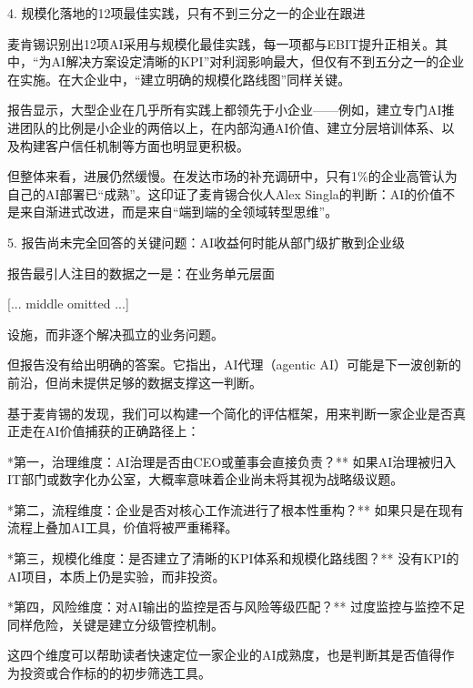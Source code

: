 \documentclass[11pt]{ctexart}
\begin{document}
4. 规模化落地的12项最佳实践，只有不到三分之一的企业在跟进

麦肯锡识别出12项AI采用与规模化最佳实践，每一项都与EBIT提升正相关。其中，“为AI解决方案设定清晰的KPI”对利润影响最大，但仅有不到五分之一的企业在实施。在大企业中，“建立明确的规模化路线图”同样关键。

报告显示，大型企业在几乎所有实践上都领先于小企业——例如，建立专门AI推进团队的比例是小企业的两倍以上，在内部沟通AI价值、建立分层培训体系、以及构建客户信任机制等方面也明显更积极。

但整体来看，进展仍然缓慢。在发达市场的补充调研中，只有1\%的企业高管认为自己的AI部署已“成熟”。这印证了麦肯锡合伙人Alex Singla的判断：AI的价值不是来自渐进式改进，而是来自“端到端的全领域转型思维”。

5. 报告尚未完全回答的关键问题：AI收益何时能从部门级扩散到企业级

报告最引人注目的数据之一是：在业务单元层面

[... middle omitted ...]

设施，而非逐个解决孤立的业务问题。

但报告没有给出明确的答案。它指出，AI代理（agentic AI）可能是下一波创新的前沿，但尚未提供足够的数据支撑这一判断。

基于麦肯锡的发现，我们可以构建一个简化的评估框架，用来判断一家企业是否真正走在AI价值捕获的正确路径上：

*第一，治理维度：AI治理是否由CEO或董事会直接负责？** 如果AI治理被归入IT部门或数字化办公室，大概率意味着企业尚未将其视为战略级议题。

*第二，流程维度：企业是否对核心工作流进行了根本性重构？** 如果只是在现有流程上叠加AI工具，价值将被严重稀释。

*第三，规模化维度：是否建立了清晰的KPI体系和规模化路线图？** 没有KPI的AI项目，本质上仍是实验，而非投资。

*第四，风险维度：对AI输出的监控是否与风险等级匹配？** 过度监控与监控不足同样危险，关键是建立分级管控机制。

这四个维度可以帮助读者快速定位一家企业的AI成熟度，也是判断其是否值得作为投资或合作标的的初步筛选工具。
\end{document}

